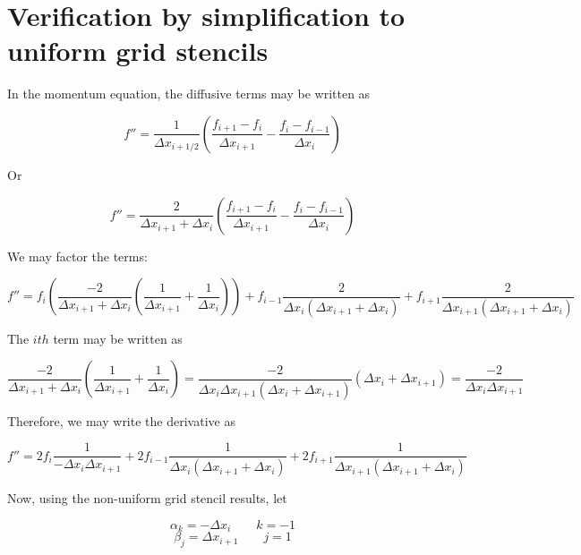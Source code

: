 \documentclass[11pt]{article}
\begin{document}
\section{Verification by simplification to uniform grid stencils}
In the momentum equation, the diffusive terms may be written as

\begin{equation}
  f'' = \frac{1}{\Delta x_{i+1/2}}
  \left(
  \frac{f_{i+1} - f_i}{\Delta x_{i+1}}
  -
  \frac{f_{i} - f_{i-1}}{\Delta x_{i}}
  \right)
\end{equation}

Or

\begin{equation}
  f'' = 
  \frac{2}{\Delta x_{i+1} + \Delta x_{i}}
  \left(
  \frac{f_{i+1} - f_i}{\Delta x_{i+1}}
  -
  \frac{f_{i} - f_{i-1}}{\Delta x_{i}}
  \right)
\end{equation}

We may factor the terms:

\begin{equation}
  f'' = 
  f_i
  \left(
  \frac{-2}{\Delta x_{i+1} + \Delta x_i}
  \left(
  \frac{1}{\Delta x_{i+1}}+\frac{1}{\Delta x_{i}}
  \right)
  \right)
  +
  f_{i-1}
  \frac{2}{\Delta x_i (\Delta x_{i+1} + \Delta x_i)}
  +
  f_{i+1}
  \frac{2}{\Delta x_{i+1} (\Delta x_{i+1} + \Delta x_i)}
\end{equation}

The $ith$ term may be written as

\begin{equation}
  \frac{-2}{\Delta x_{i+1} + \Delta x_i}
  \left(
  \frac{1}{\Delta x_{i+1}}+\frac{1}{\Delta x_{i}}
  \right)
  =
  \frac{-2}{\Delta x_i \Delta x_{i+1} (\Delta x_i + \Delta x_{i+1})}
  (\Delta x_i + \Delta x_{i+1})
  =
  \frac{-2}{\Delta x_i \Delta x_{i+1}}
\end{equation}

Therefore, we may write the derivative as

\begin{equation}
  f'' 
  = 
  2 f_i
  \frac{1}{-\Delta x_i \Delta x_{i+1}}
  +
  2 f_{i-1}
  \frac{1}{\Delta x_i (\Delta x_{i+1} + \Delta x_i)}
  + 
  2 f_{i+1}
  \frac{1}{\Delta x_{i+1} (\Delta x_{i+1} + \Delta x_i)}
\end{equation}

Now, using the non-uniform grid stencil results, let

\begin{equation}
  \alpha_k = -\Delta x_i \qquad k = -1
\end{equation}
\begin{equation}
  \beta_j = \Delta x_{i+1} \qquad j = 1
\end{equation}
\end{document}
